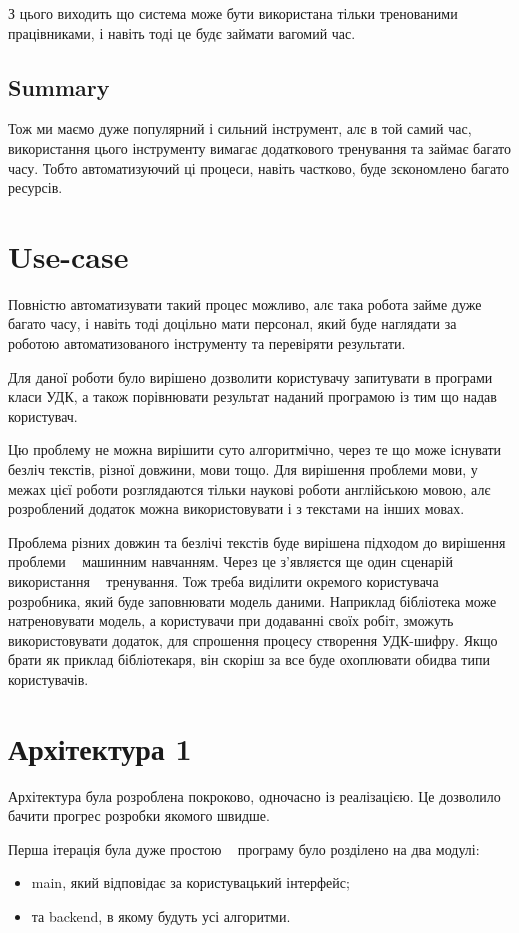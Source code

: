 \documentclass{article}
\let\oldsection\section
\renewcommand{\section}{\clearpage\oldsection}
\begin{document}
З цього виходить що система може бути використана тільки тренованими працівниками,
і навіть тоді це будє займати вагомий час.

\subsection{Summary}
Тож ми маємо дуже популярний і сильний інструмент, алє в той самий час,
використання цього інструменту вимагає додаткового тренування та займає багато часу.
Тобто автоматизуючий ці процеси, навіть частково, буде зєкономлено багато ресурсів.

\section{Use-case}
Повністю автоматизувати такий процес можливо,
алє така робота займе дуже багато часу, і навіть тоді доцільно мати персонал,
який буде наглядати за роботою автоматизованого інструменту та перевіряти результати.

Для даної роботи було вирішено дозволити користувачу запитувати в програми класи УДК,
а також порівнювати результат наданий програмою із тим що надав користувач.

Цю проблему не можна вирішити суто алгоритмічно, через те що може існувати безліч текстів,
різної довжини, мови тощо.
Для вирішення проблеми мови, у межах цієї роботи розглядаются тільки
наукові роботи англійською мовою, алє розроблений додаток можна використовувати
і з текстами на інших мовах.

Проблема різних довжин та безлічі текстів буде вирішена підходом до вирішення проблеми 
\textemdash~ машинним навчанням.
Через це з'являєтся ще один сценарій використання \textemdash~ тренування.
Тож треба виділити окремого користувача \textemdash~ розробника, який буде заповнювати модель даними.
Наприклад бібліотека може натреновувати модель, а користувачи при додаванні своїх робіт,
зможуть використовувати додаток, для спрошення процесу створення УДК-шифру.
Якщо брати як приклад бібліотекаря, він скоріш за все буде охоплювати обидва типи користувачів.

\section{Архітектура 1}
Архітектура була розроблена покроково, одночасно із реалізацією.
Це дозволило бачити прогрес розробки якомого швидше.

Перша ітерація була дуже простою \textemdash~ програму було розділено на два модулі:
\begin{itemize}
\item main, який відповідає за користувацький інтерфейс;
\item та backend, в якому будуть усі алгоритми.
\end{itemize}
\end{document}
